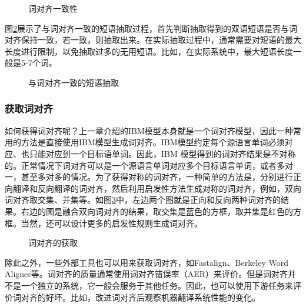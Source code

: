 \begin{figure}[htp]
\centering

\caption{词对齐一致性}
\label{fig:4-14}
\end{figure}

\parinterval 图\ref{fig:4-15}展示了与词对齐一致的短语抽取过程，首先判断抽取得到的双语短语是否与词对齐保持一致，若一致，则抽取出来。在实际抽取过程中，通常需要对短语的最大长度进行限制，以免抽取过多的无用短语。比如，在实际系统中，最大短语长度一般是5-7个词。

\begin{figure}[htp]
\centering

\caption{与词对齐一致的短语抽取}
\label{fig:4-15}
\end{figure}


\subsubsection{获取词对齐}

\parinterval 如何获得词对齐呢？上一章介绍的IBM模型本身就是一个词对齐模型，因此一种常用的方法是直接使用IBM模型生成词对齐。IBM模型约定每个源语言单词必须对应、也只能对应到一个目标语单词。因此，IBM 模型得到的词对齐结果是不对称的。正常情况下词对齐可以是一个源语言单词对应多个目标语言单词，或者多对一，甚至多对多的情况。为了获得对称的词对齐，一种简单的方法是，分别进行正向翻译和反向翻译的词对齐，然后利用启发性方法生成对称的词对齐，例如，双向词对齐取交集、并集等。如图\ref{fig:4-16}中，左边两个图就是正向和反向两种词对齐的结果。右边的图是融合双向词对齐的结果，取交集是蓝色的方框，取并集是红色的方框。当然，还可以设计更多的启发性规则生成词对齐\cite{koehn2000estimating,koehn2007factored}。

\begin{figure}[htp]
\centering

\caption{词对齐的获取}
\label{fig:4-16}
\end{figure}

\parinterval 除此之外，一些外部工具也可以用来获取词对齐，如Fastalign\cite{dyer2013a}、Berkeley Word Aligner\cite{taskar2005a}等。词对齐的质量通常使用词对齐错误率（AER）来评价\cite{DBLP:conf/coling/OchN00}。但是词对齐并不是一个独立的系统，它一般会服务于其他任务。因此，也可以使用下游任务来评价词对齐的好坏。比如，改进词对齐后观察机器翻译系统性能的变化。\\ \\ \\

